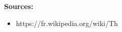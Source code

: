 \documentclass{article}
\begin{document}
\textbf{Sources:}
\begin{itemize}
    \item https://fr.wikipedia.org/wiki/Th%
\end{itemize}






\end{document}
